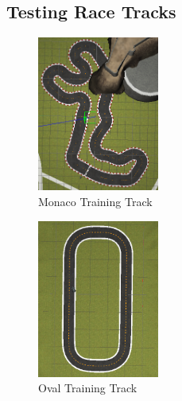 \documentclass[journal]{IEEEtran}
\begin{document}
\subsection{Testing Race Tracks}
\begin{figure}[htbp]
\begin{center}
\includegraphics[width=4cm]{trainingTrack2}
\end{center}
\vspace{-2mm}
\caption{Monaco Training Track}
\label{monaco}
\end{figure}


\begin{figure}[htbp]
\begin{center}
\includegraphics[width=4cm]{trainingTrack3}
\end{center}
\vspace{-2mm}
\caption{Oval Training Track}
\label{oval}
\end{figure}
\end{document}
